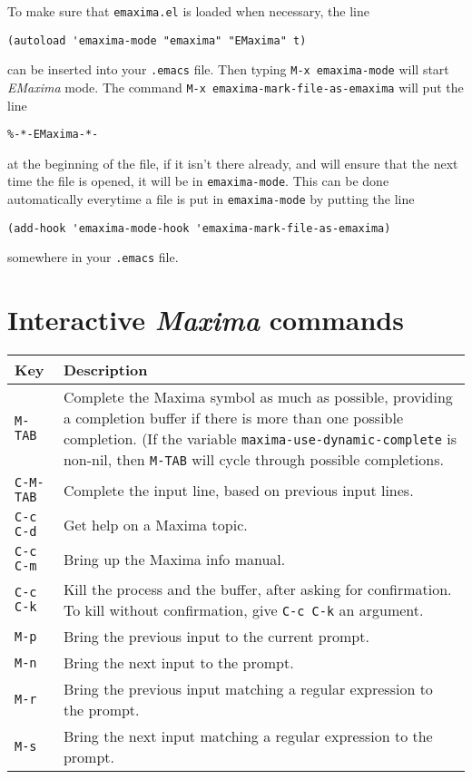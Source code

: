 \documentclass{article}
\newcommand{\emx}{\textsl{\sffamily EMaxima}}
\newcommand{\mx}{\textsl{\sffamily Maxima}}
\begin{document}
To make sure that \texttt{emaxima.el} is loaded when necessary, the line
\begin{verbatim}
(autoload 'emaxima-mode "emaxima" "EMaxima" t)
\end{verbatim}
\noindent
can be inserted into your \texttt{.emacs} file.  Then typing
\texttt{M-x emaxima-mode} will start \emx{} mode.  The command 
\texttt{M-x emaxima-mark-file-as-emaxima} will put the line
\begin{verbatim}
%-*-EMaxima-*-
\end{verbatim}
\noindent
at the beginning of the file, if it isn't there already, and will ensure
that the next time the file is opened, it will be in \texttt{emaxima-mode}.  
This can be done automatically everytime a file is put in
\texttt{emaxima-mode} by putting the line
\begin{verbatim}
(add-hook 'emaxima-mode-hook 'emaxima-mark-file-as-emaxima)
\end{verbatim}
\noindent
somewhere in your \texttt{.emacs} file.

\section{Interactive \mx{} commands}
\label{app:intmx}

\smallskip

\begin{tabular}{p{\firstcol}p{\secondcol}}
\hline
\textbf{Key} & \textbf{Description}\\
\hline
\texttt{M-TAB} & Complete the Maxima symbol as much as possible, providing
     a completion buffer if there is more than one possible
     completion.  (If the variable
     \texttt{maxima-use-dynamic-complete} is non-nil, then
     \texttt{M-TAB} will cycle through possible completions.\\
\texttt{C-M-TAB} & Complete the input line, based on previous input lines.\\
\texttt{C-c C-d} & Get help on a Maxima topic.\\
\texttt{C-c C-m} & Bring up the Maxima info manual.\\
\texttt{C-c C-k} & Kill the process and the buffer, after asking for
  confirmation.  To kill without confirmation, give \texttt{C-c C-k} an
  argument.\\
\texttt{M-p} & Bring the previous input to the current prompt.\\
\texttt{M-n} & Bring the next input to the prompt.\\
\texttt{M-r} & Bring the previous input matching
  a regular expression to the prompt.\\
\texttt{M-s} & Bring the next input matching
  a regular expression to the prompt.
\end{tabular}
\end{document}
